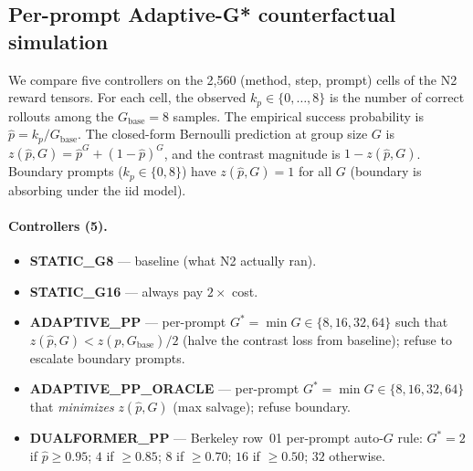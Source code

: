 \label{sec:p7-iter131-per-prompt-adaptive-gstar}
%
%

\subsection*{Per-prompt Adaptive-G* counterfactual simulation}

We compare five controllers on the 2,560 (method, step, prompt) cells of
the N2 reward tensors. For each cell, the observed $k_p \in \{0, \ldots, 8\}$
is the number of correct rollouts among the $G_{\mathrm{base}}{=}8$ samples.
The empirical success probability is $\hat{p} = k_p / G_{\mathrm{base}}$.
The closed-form Bernoulli prediction at group size $G$ is
$z(\hat{p}, G) = \hat{p}^G + (1-\hat{p})^G$, and the contrast magnitude is
$1 - z(\hat{p}, G)$. Boundary prompts ($k_p \in \{0, 8\}$) have
$z(\hat{p}, G) = 1$ for all $G$ (boundary is absorbing under the iid model).

\paragraph{Controllers (5).}

\begin{itemize}
\item \textbf{STATIC\_G8} --- baseline (what N2 actually ran).
\item \textbf{STATIC\_G16} --- always pay $2\times$ cost.
\item \textbf{ADAPTIVE\_PP} --- per-prompt $G^* = \min G \in \{8,16,32,64\}$
      such that $z(\hat{p}, G) < z(\hat{p}, G_{\mathrm{base}}) / 2$
      (halve the contrast loss from baseline); refuse to escalate boundary
      prompts.
\item \textbf{ADAPTIVE\_PP\_ORACLE} --- per-prompt $G^* = \min G \in \{8,16,32,64\}$
      that \emph{minimizes} $z(\hat{p}, G)$ (max salvage); refuse boundary.
\item \textbf{DUALFORMER\_PP} --- Berkeley row~01 per-prompt auto-$G$ rule:
      $G^*=2$ if $\hat{p}\geq 0.95$; $4$ if $\geq 0.85$; $8$ if $\geq 0.70$;
      $16$ if $\geq 0.50$; $32$ otherwise.
\end{itemize}

